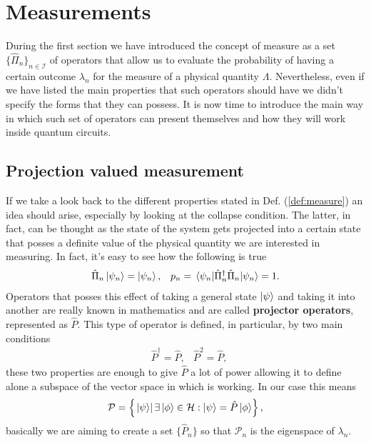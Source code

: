 \section{Measurements}

During the first section we have introduced the concept of measure as a set $\{ \hat{\Pi}_n \}_{n\in\mathcal{I}}$ of operators that allow us to evaluate the probability of having a certain outcome $\lambda_n$ for the measure of a physical quantity $\Lambda$. Nevertheless, even if we have listed the main properties that such operators should have we didn't specify the forms that they can possess. It is now time to introduce the main way in which such set of operators can present themselves and how they will work inside quantum circuits.

\subsection{Projection valued measurement}

If we take a look back to the different properties stated in Def. (\ref{def:measure}) an idea should arise, especially by looking at the collapse condition. The latter, in fact, can be thought as the state of the system gets projected into a certain state that posses a definite value of the physical quantity we are interested in measuring. In fact, it's easy to see how the following is true
\begin{align}
    &\hat{\Pi}_n \ket{\psi_n} = \ket{\psi_n}, &p_n = \ev{\hat{\Pi}_n^\dagger\hat{\Pi}_n}{\psi_n} = 1.
\end{align}
Operators that posses this effect of taking a general state $\ket{\psi}$ and taking it into another are really known in mathematics and are called \textbf{projector operators}, represented as $\hat{P}$. This type of operator is defined, in particular, by two main conditions
\begin{align}
    \label{eq:ProjDef}
    &\hat{P}^\dagger = \hat{P}, & \hat{P}^2 = \hat{P},
\end{align}
these two properties are enough to give $\hat{P}$ a lot of power allowing it to define alone a subspace of the vector space in which is working. In our case this means
\begin{equation}
    \mathcal{P} = \left\{ \left.\ket{\psi}\right| \exists \ket{\phi} \in \mathcal{H}: \ket{\psi} = \hat{P}\ket{\phi} \right\},
\end{equation}
basically we are aiming to create a set $\{ \hat{P}_n \}$ so that $\mathcal{P}_n$ is the eigenspace of $\lambda_n$.


